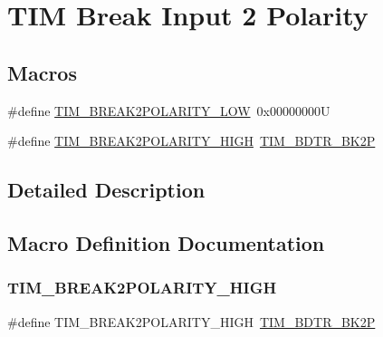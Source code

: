 \hypertarget{group___t_i_m___break2___polarity}{}\section{T\+IM Break Input 2 Polarity}
\label{group___t_i_m___break2___polarity}
\subsection*{Macros}
\begin{DoxyCompactItemize}
\item 
\#define \mbox{\hyperlink{group___t_i_m___break2___polarity_gaf7996c33cc0bcaf750550358700008b2}{T\+I\+M\+\_\+\+B\+R\+E\+A\+K2\+P\+O\+L\+A\+R\+I\+T\+Y\+\_\+\+L\+OW}}~0x00000000U
\item 
\#define \mbox{\hyperlink{group___t_i_m___break2___polarity_ga36a8e307c7c6c42ebf5f5d5d2fb259d4}{T\+I\+M\+\_\+\+B\+R\+E\+A\+K2\+P\+O\+L\+A\+R\+I\+T\+Y\+\_\+\+H\+I\+GH}}~\mbox{\hyperlink{group___peripheral___registers___bits___definition_ga94911ade52aef76f5ad41613f9fc9590}{T\+I\+M\+\_\+\+B\+D\+T\+R\+\_\+\+B\+K2P}}
\end{DoxyCompactItemize}


\subsection{Detailed Description}


\subsection{Macro Definition Documentation}
\mbox{\label{group___t_i_m___break2___polarity_ga36a8e307c7c6c42ebf5f5d5d2fb259d4}} 
\subsubsection{\texorpdfstring{TIM\_BREAK2POLARITY\_HIGH}{TIM\_BREAK2POLARITY\_HIGH}}
{\footnotesize\ttfamily \#define T\+I\+M\+\_\+\+B\+R\+E\+A\+K2\+P\+O\+L\+A\+R\+I\+T\+Y\+\_\+\+H\+I\+GH~\mbox{\hyperlink{group___peripheral___registers___bits___definition_ga94911ade52aef76f5ad41613f9fc9590}{T\+I\+M\+\_\+\+B\+D\+T\+R\+\_\+\+B\+K2P}}}

